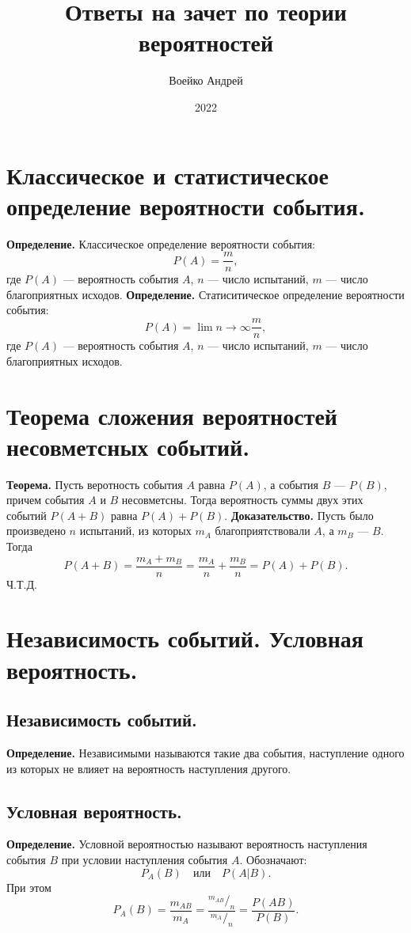 \documentclass[a4paper,11pt,oneside]{article}
\title{Ответы на зачет по теории вероятностей}
\author{Воейко Андрей}
\date{2022}
\newcommand*\rfrac[2]{{}^{#1}\!/_{#2}}
\begin{document}
\maketitle

\section{Классическое и статистическое определение вероятности события.}
\textbf{Определение.} Классическое определение вероятности события:
\[
  P(A) = \frac{m}{n},
\]
где $P(A)$ --- вероятность события $A$, $n$ --- число испытаний, $m$ --- число благоприятных исходов.\newline
\textbf{Определение.} Статиситическое определение вероятности события:
\[
  P(A) = \lim{n \to \infty} \frac{m}{n},
\]
где $P(A)$ --- вероятность события $A$, $n$ --- число испытаний, $m$ --- число благоприятных исходов.
\section{Теорема сложения вероятностей несовметсных событий.}
\textbf{Теорема.} Пусть веротность события $A$ равна $P(A)$, а события $B$ --- $P(B)$, причем события $A$ и $B$ несовметсны. Тогда вероятность суммы двух этих событий $P(A + B)$ равна $P(A) + P(B)$.\newline
\textbf{Доказательство.} Пусть было произведено $n$ испытаний, из которых $m_{A}$ благоприятствовали $A$, а $m_{B}$ --- $B$. Тогда
\[
  P(A + B) = \frac{m_{A} + m_{B}}{n} = \frac{m_{A}}{n} + \frac{m_{B}}{n} = P(A) + P(B).
\]
Ч.Т.Д.
\section{Независимость событий. Условная вероятность.}
\subsection{Независимость событий.}
\textbf{Определение.} Независимыми называются такие два события, наступление одного из которых не влияет на вероятность наступления другого.
\subsection{Условная вероятность.}
\textbf{Определение.} Условной вероятностью называют вероятность наступления события $B$ при условии наступления события $A$.\newline
Обозначают:
\[
  P_{A}(B) \quad \text{или} \quad P(A|B).
\]
При этом
\[
  P_{A}(B) = \frac{m_{AB}}{m_{A}} = \frac{\rfrac{m_{AB}}{n}}{\rfrac{m_{A}}{n}} = \frac{P(AB)}{P(B)}.
\]
\end{document}
